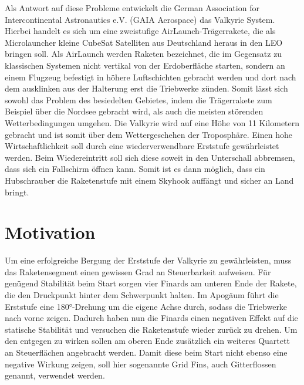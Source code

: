Als Antwort auf diese Probleme entwickelt die German Association for Intercontinental Astronautics e.V. (GAIA Aerospace) das Valkyrie System. Hierbei handelt es sich um eine zweistufige AirLaunch-Trägerrakete, die als Microlauncher kleine CubeSat Satelliten aus Deutschland heraus in den LEO bringen soll. Als AirLaunch werden Raketen bezeichnet, die im Gegensatz zu klassischen Systemen nicht vertikal von der Erdoberfläche starten, sondern an einem Flugzeug befestigt in höhere Luftschichten gebracht werden und dort nach dem ausklinken aus der Halterung erst die Triebwerke zünden. Somit lässt sich sowohl das Problem des besiedelten Gebietes, indem die Trägerrakete zum Beispiel über die Nordsee gebracht wird, als auch die meisten störenden Wetterbedingungen umgehen. Die Valkyrie wird auf eine Höhe von 11 Kilometern gebracht und ist somit über dem Wettergeschehen der Troposphäre. Einen hohe Wirtschaftlichkeit soll durch eine wiederverwendbare Erststufe gewährleistet werden. Beim Wiedereintritt soll sich diese soweit in den Unterschall abbremsen, dass sich ein Fallschirm öffnen kann. Somit ist es dann möglich, dass ein Hubschrauber die Raketenstufe mit einem Skyhook auffängt und sicher an Land bringt.

\section{Motivation}
Um eine erfolgreiche Bergung der Erststufe der Valkyrie zu gewährleisten, muss das Raketensegment einen gewissen Grad an Steuerbarkeit aufweisen. Für genügend Stabilität beim Start sorgen vier Finards am unteren Ende der Rakete, die den Druckpunkt hinter dem Schwerpunkt halten. Im Apogäum führt die Erststufe eine 180°-Drehung um die eigene Achse durch, sodass die Triebwerke nach vorne zeigen. Dadurch haben nun die Finards einen negativen Effekt auf die statische Stabilität und versuchen die Raketenstufe wieder zurück zu drehen. Um den entgegen zu wirken sollen am oberen Ende zusätzlich ein weiteres Quartett an Steuerflächen angebracht werden. Damit diese beim Start nicht ebenso eine negative Wirkung zeigen, soll hier sogenannte Grid Fins, auch Gitterflossen genannt, verwendet werden.

